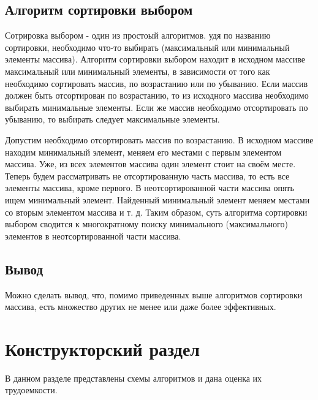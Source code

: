 \documentclass[14pt, a4paper]{extarticle}
\begin{document}
	\subsection{Алгоритм сортировки выбором}
	Сотрировка выбором - один из простоый алгоритмов. удя по названию сортировки, необходимо что-то выбирать (максимальный или минимальный элементы массива). Алгоритм сортировки выбором находит в исходном массиве максимальный или минимальный элементы, в зависимости от того как необходимо сортировать массив, по возрастанию или по убыванию. Если массив должен быть отсортирован по возрастанию, то из исходного массива необходимо выбирать минимальные элементы. Если же массив необходимо отсортировать по убыванию, то выбирать следует максимальные элементы.
	
	Допустим необходимо отсортировать массив по возрастанию. В исходном массиве находим минимальный элемент, меняем его местами с первым элементом массива. Уже, из всех элементов массива один элемент стоит на своём месте. Теперь будем рассматривать не отсортированную часть массива, то есть все элементы массива, кроме первого. В неотсортированной части массива опять ищем минимальный элемент. Найденный минимальный элемент меняем местами со вторым элементом массива и т. д. Таким образом, суть алгоритма сортировки выбором сводится к многократному поиску минимального (максимального) элементов в неотсортированной части массива.
	
	\subsection*{Вывод}
	Можно сделать вывод, что, помимо приведенных выше алгоритмов сортировки массива, есть множество других не менее или даже более эффективных.
	
	
	\clearpage
	\section{Конструкторский раздел}
	В данном разделе представлены схемы алгоритмов и дана оценка их трудоемкости.
	
\end{document}
